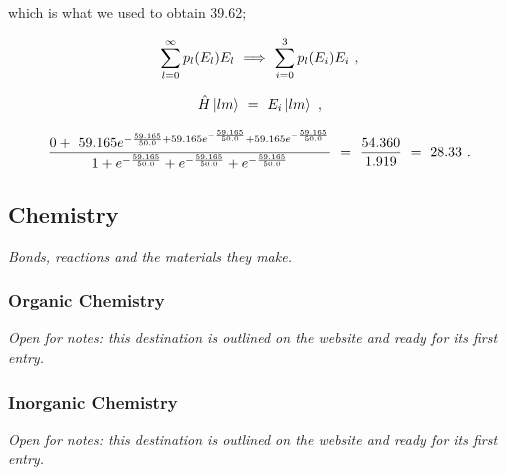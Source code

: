 \documentclass{article}
\begin{document}
which is what we used to obtain 39.62;
 
\begin{equation} \label{rotor-eq-279-1}
\sum_{l=0}^{\infty} p_{l}(E_{l}) E_{l} \hspace{0.125cm} \Longrightarrow \hspace{0.125cm} \sum_{i=0}^{3} p_{l}(E_{i}) E_{i} \hspace{0.125cm} ,
\end{equation}

\begin{equation} \label{rotor-eq-280-1}
\hat{H} \ket{l m} \hspace{0.125cm} = \hspace{0.125cm} E_{i} \ket{l m} \hspace{0.125cm} ,
\end{equation}

\begin{equation} \label{rotor-eq-281-1}
\frac{0 + \hspace{0.125cm} 59.165 e^{-\frac{59.165}{50.0} + 59.165 e^{-\frac{59.165}{50.0}}  + 59.165 e^{-\frac{59.165}{50.0}}}}{1 + e^{-\frac{59.165}{50.0}} + e^{-\frac{59.165}{50.0}} + e^{-\frac{59.165}{50.0}}} \hspace{0.125cm} = \hspace{0.125cm} \frac{54.360}{1.919} \hspace{0.125cm} = \hspace{0.125cm} 28.33 \hspace{0.125cm} .
\end{equation} 

\subsection{Chemistry}\label{sec:chemistry}
\textit{Bonds, reactions and the materials they make.}

\subsubsection{Organic Chemistry}\label{sec:organic-chemistry}
\textit{Open for notes: this destination is outlined on the website and ready for its first entry.}

\subsubsection{Inorganic Chemistry}\label{sec:inorganic-chemistry}
\textit{Open for notes: this destination is outlined on the website and ready for its first entry.}
\end{document}
